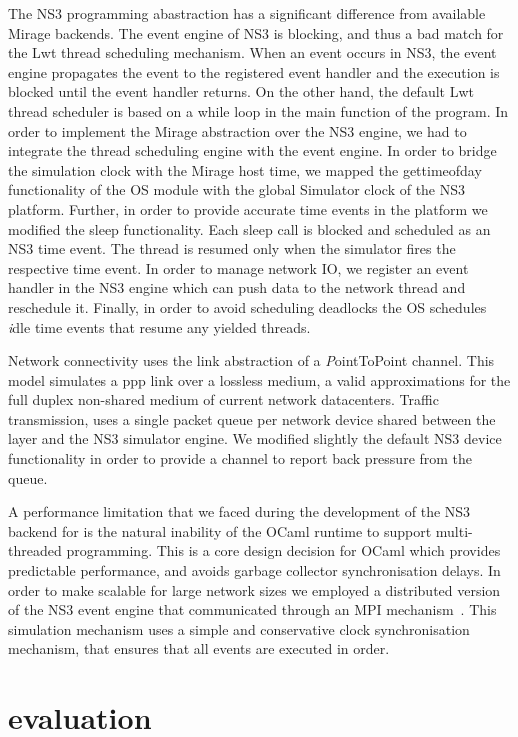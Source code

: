 The NS3 programming abastraction has a significant difference from available
Mirage backends. The event engine of NS3 is blocking, and thus a bad match for
the Lwt thread scheduling mechanism. When an event occurs in NS3, the event
engine propagates the event to the registered event handler and the execution is
blocked until the event handler returns. On the other hand, the default Lwt
thread scheduler is based on a while loop in the main function of the program.
In order to implement the Mirage abstraction over the NS3 engine, we had to
integrate the thread scheduling engine with the event engine.  In order to
bridge the simulation clock with the Mirage host time, we mapped the
gettimeofday functionality of the OS module with the global Simulator clock of
the NS3 platform. Further, in order to provide accurate time events in the
\mirage platform we modified the sleep functionality. Each sleep call is blocked
and scheduled as an NS3 time event. The thread is resumed only when the
simulator fires the respective time event. In order to manage network IO, we
register an event handler in the NS3 engine which can push data to the network
thread and reschedule it. Finally, in order to avoid scheduling deadlocks the OS
schedules {\emph idle} time events that resume any yielded threads.

Network connectivity uses the link abstraction of a {\emph PointToPoint
  channel}. This model simulates a ppp link over a lossless medium, a valid
approximations for the full duplex non-shared medium of current network
datacenters. Traffic transmission, uses a single packet queue per network device
shared between the \mirage layer and the NS3 simulator engine.  We modified
slightly the default NS3 device functionality in order to provide a channel to
report back pressure from the queue.

A performance limitation that we faced during the development of the NS3 backend
for \sdnsim is the natural inability of the OCaml runtime to support
multi-threaded programming. This is a core design decision for OCaml which
provides predictable performance, and avoids garbage collector synchronisation
delays. In order to make \sdnsim scalable for large network sizes we employed a
distributed version of the NS3 event engine that communicated through an MPI
mechanism~\cite{Pelkey:2011ua}. This simulation mechanism uses a simple and
conservative clock synchronisation mechanism, that ensures that all events are
executed in order. 


\section{\sdnsim evaluation} \label{sec:sdnsim-precision}

